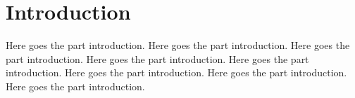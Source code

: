 \chapter{Introduction}

Here goes the part introduction.
Here goes the part introduction.
Here goes the part introduction.
Here goes the part introduction.
Here goes the part introduction.
Here goes the part introduction.
Here goes the part introduction.
Here goes the part introduction.




